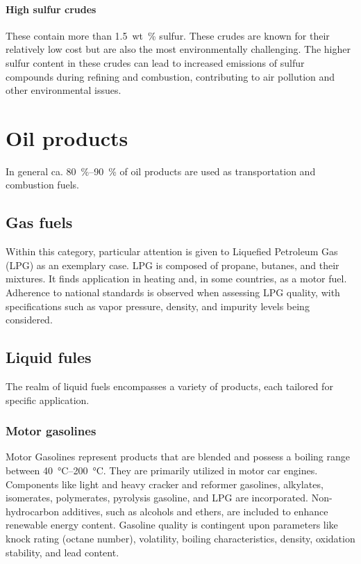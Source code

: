 \paragraph{High sulfur crudes} These contain more than \SI{1.5}{wt\%} sulfur.
These crudes are known for their relatively low cost but are also the most environmentally challenging.
The higher sulfur content in these crudes can lead to increased emissions of sulfur compounds during refining and combustion, contributing to air pollution and other environmental issues.

\section{Oil products}
In general ca. \SIrange{80}{90}{\percent} of oil products are used as transportation and combustion fuels.

\subsection{Gas fuels}
Within this category, particular attention is given to Liquefied Petroleum Gas (LPG) as an exemplary case.
LPG is composed of propane, butanes, and their mixtures.
It finds application in heating and, in some countries, as a motor fuel.
Adherence to national standards is observed when assessing LPG quality, with specifications such as vapor pressure, density, and impurity levels being considered.

\subsection{Liquid fules}
The realm of liquid fuels encompasses a variety of products, each tailored for specific application.

\subsubsection{Motor gasolines}
Motor Gasolines represent products that are blended and possess a boiling range between \SIrange{40}{200}{\celsius}.
They are primarily utilized in motor car engines.
Components like light and heavy cracker and reformer gasolines, alkylates, isomerates, polymerates, pyrolysis gasoline, and LPG are incorporated.
Non-hydrocarbon additives, such as alcohols and ethers, are included to enhance renewable energy content.
Gasoline quality is contingent upon parameters like knock rating (octane number), volatility, boiling characteristics, density, oxidation stability, and lead content.

